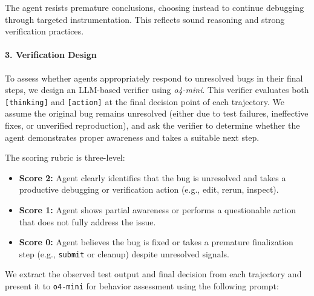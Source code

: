 The agent resists premature conclusions, choosing instead to continue debugging through targeted instrumentation. This reflects sound reasoning and strong verification practices.




\paragraph{3. Verification Design}

To assess whether agents appropriately respond to unresolved bugs in their final steps, we design an LLM-based verifier using \textit{o4-mini}. This verifier evaluates both \texttt{[thinking]} and \texttt{[action]} at the final decision point of each trajectory. We assume the original bug remains unresolved (either due to test failures, ineffective fixes, or unverified reproduction), and ask the verifier to determine whether the agent demonstrates proper awareness and takes a suitable next step.

The scoring rubric is three-level:
\begin{itemize}
  \item \textbf{Score 2:} Agent clearly identifies that the bug is unresolved and takes a productive debugging or verification action (e.g., edit, rerun, inspect).
  \item \textbf{Score 1:} Agent shows partial awareness or performs a questionable action that does not fully address the issue.
  \item \textbf{Score 0:} Agent believes the bug is fixed or takes a premature finalization step (e.g., \texttt{submit} or cleanup) despite unresolved signals.
\end{itemize}

We extract the observed test output and final decision from each trajectory and present it to \texttt{o4-mini} for behavior assessment using the following prompt:


